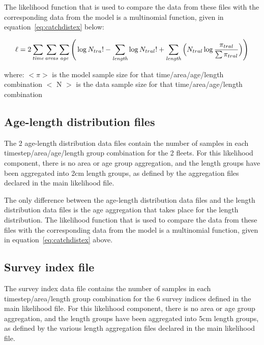 \documentclass[10pt,titlepage]{article}
\begin{document}
\bigskip
The likelihood function that is used to compare the data from these files with the corresponding data from the model is a multinomial function, given in equation~\ref{eq:catchdistex} below:

\begin{equation}\label{eq:catchdistex}
\ell = 2 \sum_{\it time}\sum_{\it areas}\sum_{\it age} \Bigg( \log N_{tra}! - \sum_{\it length} \log N_{tral}! + \sum_{\it length} \Big( N_{tral} \log {\frac{\pi_{tral}}{\sum \pi_{tral}}} \Big)\Bigg)
\end{equation}

where:\newline
$<\pi>$ is the model sample size for that time/area/age/length combination\newline
$<$ N $>$ is the data sample size for that time/area/age/length combination

{\small }
{\small }

\subsection{Age-length distribution files}

The 2 age-length distribution data files contain the number of samples in each timestep/area/age/length group combination for the 2 fleets.  For this likelihood component, there is no area or age group aggregation, and the length groups have been aggregated into 2cm length groups, as defined by the aggregation files declared in the main likelihood file.

\bigskip
The only difference between the age-length distribution data files and the length distribution data files is the age aggregation that takes place for the length distribution.  The likelihood function that is used to compare the data from these files with the corresponding data from the model is a multinomial function, given in equation~\ref{eq:catchdistex} above.

{\small }
{\small }

\subsection{Survey index file}

The survey index data file contains the number of samples in each timestep/area/length group combination for the 6 survey indices defined in the main likelihood file.  For this likelihood component, there is no area or age group aggregation, and the length groups have been aggregated into 5cm length groups, as defined by the various length aggregation files declared in the main likelihood file.
\end{document}
